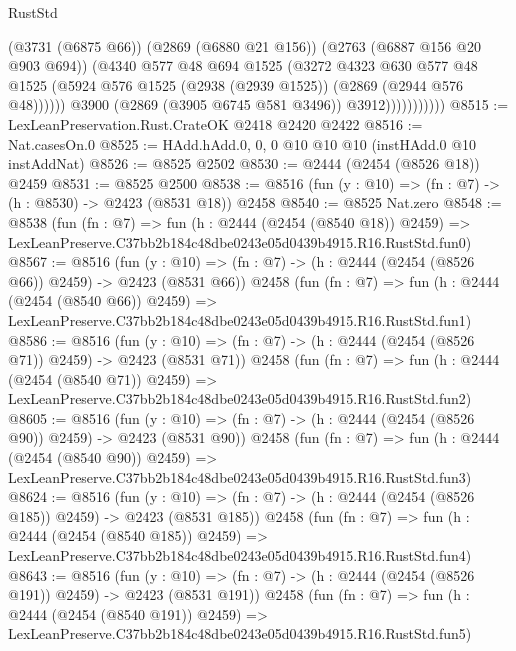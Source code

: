 \begin{lexlean}{RustStd}
\begin{coremodule}
                            (@3731 (@6875 @66))
                            (@2869 (@6880 @21 @156))
                            (@2763 (@6887 @156 @20 @903 @694))
                            (@4340
                              @577
                              @48
                              @694
                              @1525
                              (@3272
                                @4323
                                @630
                                @577
                                @48
                                @1525
                                (@5924 @576 @1525 (@2938 (@2939 @1525)) (@2869 (@2944 @576 @48))))))
                          @3900
                          (@2869 (@3905 @6745 @581 @3496))
                          @3912)))))))))))
@8515 := LexLeanPreservation.Rust.CrateOK @2418 @2420 @2422
@8516 := Nat.casesOn.{0}
@8525 := HAdd.hAdd.{0, 0, 0} @10 @10 @10 (instHAdd.{0} @10 instAddNat)
@8526 := @8525 @2502
@8530 := @2444 (@2454 (@8526 @18)) @2459
@8531 := @8525 @2500
@8538 := @8516 (fun (y : @10) => (fn : @7) -> (h : @8530) -> @2423 (@8531 @18)) @2458
@8540 := @8525 Nat.zero
@8548 := @8538
    (fun (fn : @7) =>
    fun (h : @2444 (@2454 (@8540 @18)) @2459) =>
    LexLeanPreserve.C37bb2b184c48dbe0243e05d0439b4915.R16.RustStd.fun0)
@8567 := @8516
    (fun (y : @10) => (fn : @7) -> (h : @2444 (@2454 (@8526 @66)) @2459) -> @2423 (@8531 @66))
    @2458
    (fun (fn : @7) =>
    fun (h : @2444 (@2454 (@8540 @66)) @2459) =>
    LexLeanPreserve.C37bb2b184c48dbe0243e05d0439b4915.R16.RustStd.fun1)
@8586 := @8516
    (fun (y : @10) => (fn : @7) -> (h : @2444 (@2454 (@8526 @71)) @2459) -> @2423 (@8531 @71))
    @2458
    (fun (fn : @7) =>
    fun (h : @2444 (@2454 (@8540 @71)) @2459) =>
    LexLeanPreserve.C37bb2b184c48dbe0243e05d0439b4915.R16.RustStd.fun2)
@8605 := @8516
    (fun (y : @10) => (fn : @7) -> (h : @2444 (@2454 (@8526 @90)) @2459) -> @2423 (@8531 @90))
    @2458
    (fun (fn : @7) =>
    fun (h : @2444 (@2454 (@8540 @90)) @2459) =>
    LexLeanPreserve.C37bb2b184c48dbe0243e05d0439b4915.R16.RustStd.fun3)
@8624 := @8516
    (fun (y : @10) => (fn : @7) -> (h : @2444 (@2454 (@8526 @185)) @2459) -> @2423 (@8531 @185))
    @2458
    (fun (fn : @7) =>
    fun (h : @2444 (@2454 (@8540 @185)) @2459) =>
    LexLeanPreserve.C37bb2b184c48dbe0243e05d0439b4915.R16.RustStd.fun4)
@8643 := @8516
    (fun (y : @10) => (fn : @7) -> (h : @2444 (@2454 (@8526 @191)) @2459) -> @2423 (@8531 @191))
    @2458
    (fun (fn : @7) =>
    fun (h : @2444 (@2454 (@8540 @191)) @2459) =>
    LexLeanPreserve.C37bb2b184c48dbe0243e05d0439b4915.R16.RustStd.fun5)

\end{coremodule}
\end{lexlean}
